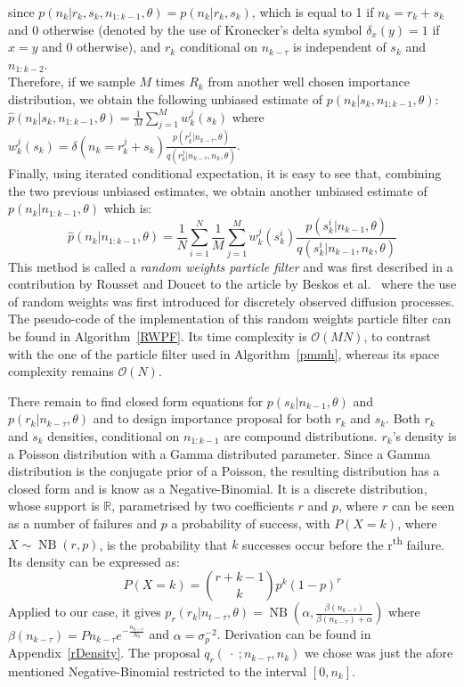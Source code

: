 \documentclass[12pt]{article}
\begin{document}
	since $p(n_k| r_k, s_k, n_{1:k-1}, \theta)=p(n_k| r_k, s_k)$, which is equal to 1 if $n_k = r_k + s_k$ and 0 otherwise (denoted by the use of Kronecker's delta symbol $\delta_x(y) = 1$ if $x=y$ and 0 otherwise), and $r_k$ conditional on $n_{k-\tau}$ is independent of $s_k$ and $n_{1:k-2}$. \\
	Therefore, if we sample $M$ times $R_k$ from another well chosen importance distribution, we obtain the following unbiased estimate of $p(n_k |s_k, n_{1:k-1}, \theta)$: $\hat{p}(n_k |s_k, n_{1:k-1}, \theta)=\frac{1}{M}\sum_{j=1}^{M}w_k^j(s_k)$ where $w_k^j(s_k) =\delta(n_k = r_k^j + s_k)\frac{p(r_k^j|n_{k-\tau}, \theta)}{q(r_k^j|n_{k-\tau}, n_k, \theta)}$. \\
	Finally, using iterated conditional expectation, it is easy to see that, combining the two previous unbiased estimates, we obtain another unbiased estimate of $p(n_k|n_{1:k-1},\theta)$ which is:
	\begin{equation}
	\hat{p}(n_k|n_{1:k-1},\theta) = \frac{1}{N}\sum_{i=1}^{N}\frac{1}{M}\sum_{j=1}^{M}w_k^j(s_k^i)\frac{p(s_k^i|n_{k-1}, \theta)}{q(s_k^i|n_{k-1}, n_k, \theta)}
	\end{equation}
	This method is called a \emph{random weights particle filter} and was first described in a contribution by Rousset and Doucet to the article by Beskos et al.~\cite{beskos2006exact} where the use of random weights was first introduced for discretely observed diffusion processes.\\
	The pseudo-code of the implementation of this random weights particle filter can be found in Algorithm~\ref{RWPF}. Its time complexity is $\mathcal{O}(MN)$, to contrast with the one of the particle filter used in Algorithm~\ref{pmmh}, whereas its space complexity remains $\mathcal{O}(N)$.
	
	There remain to find closed form equations for $p(s_k|n_{k-1}, \theta)$ and $p(r_k|n_{k-\tau}, \theta)$ and to design importance proposal for both $r_k$ and $s_k$. Both $r_k$ and $s_k$ densities, conditional on $n_{1:{k-1}}$ are compound distributions. $r_k$'s density is a Poisson distribution with a Gamma distributed parameter. Since a Gamma distribution is the conjugate prior of a Poisson, the resulting distribution has a closed form and is know as a Negative-Binomial. It is a discrete distribution, whose support is $\mathbb{R}$, parametrised by two coefficients $r$ and $p$, where $r$ can be seen as a number of failures and $p$ a probability of success, with $P(X=k)$, where $X\sim \operatorname{NB}(r, p)$, is the probability that $k$ successes occur before the r\textsuperscript{th} failure. Its density can be expressed as: 
	\begin{equation*}
	P(X=k) = \binom{r+k-1}{k}p^k(1-p)^r
	\end{equation*}
	Applied to our case, it gives $p_r(r_k|n_{t-\tau}, \theta) = \operatorname{NB}(\alpha, \frac{\beta(n_{k-\tau})}{\beta(n_{k-\tau}) + \alpha})$ where  $\beta(n_{k-\tau}) = Pn_{k-\tau}e^{-\frac{n_{k-\tau}}{N_0}}$ and $\alpha = \sigma_p^{-2}$. Derivation can be found in Appendix~\ref{rDensity}.
	The proposal $q_r(\ \cdot \ ; n_{k-\tau}, n_k)$ we chose was just the afore mentioned Negative-Binomial restricted to the interval $[0, n_k]$.
	
\end{document}
